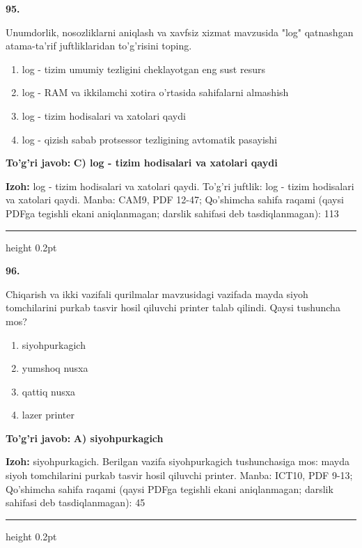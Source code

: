 \documentclass[10pt,a4paper]{article}
\begin{document}
{\bfseries\sffamily\color{ink} 95.}
\par
Unumdorlik, nosozliklarni aniqlash va xavfsiz xizmat mavzusida "log" qatnashgan atama-ta'rif juftliklaridan to'g'risini toping.
\begin{enumerate}[label=\Alph*),leftmargin=9mm]
\item log - tizim umumiy tezligini cheklayotgan eng sust resurs
\item log - RAM va ikkilamchi xotira o'rtasida sahifalarni almashish
\item log - tizim hodisalari va xatolari qaydi
\item log - qizish sabab protsessor tezligining avtomatik pasayishi
\end{enumerate}
\begin{tcolorbox}[enhanced,breakable,colback=teal!4,colframe=teal!60!black,boxrule=0.45pt,arc=1.2mm,left=2.7mm,right=2.7mm,top=1.8mm,bottom=1.8mm,before skip=2mm,after skip=2mm]
{\bfseries\sffamily\color{teal}To'g'ri javob:} \textbf{C) log - tizim hodisalari va xatolari qaydi}
\par\smallskip
{\bfseries Izoh:} log - tizim hodisalari va xatolari qaydi. To'g'ri juftlik: log - tizim hodisalari va xatolari qaydi. Manba: CAM9, PDF 12-47; Qo'shimcha sahifa raqami (qaysi PDFga tegishli ekani aniqlanmagan; darslik sahifasi deb tasdiqlanmagan): 113
\end{tcolorbox}
\vspace{2mm}\hrule height 0.2pt\vspace{3mm}

{\bfseries\sffamily\color{ink} 96.}
\par
Chiqarish va ikki vazifali qurilmalar mavzusidagi vazifada mayda siyoh tomchilarini purkab tasvir hosil qiluvchi printer talab qilindi. Qaysi tushuncha mos?
\begin{enumerate}[label=\Alph*),leftmargin=9mm]
\item siyohpurkagich
\item yumshoq nusxa
\item qattiq nusxa
\item lazer printer
\end{enumerate}
\begin{tcolorbox}[enhanced,breakable,colback=teal!4,colframe=teal!60!black,boxrule=0.45pt,arc=1.2mm,left=2.7mm,right=2.7mm,top=1.8mm,bottom=1.8mm,before skip=2mm,after skip=2mm]
{\bfseries\sffamily\color{teal}To'g'ri javob:} \textbf{A) siyohpurkagich}
\par\smallskip
{\bfseries Izoh:} siyohpurkagich. Berilgan vazifa siyohpurkagich tushunchasiga mos: mayda siyoh tomchilarini purkab tasvir hosil qiluvchi printer. Manba: ICT10, PDF 9-13; Qo'shimcha sahifa raqami (qaysi PDFga tegishli ekani aniqlanmagan; darslik sahifasi deb tasdiqlanmagan): 45
\end{tcolorbox}
\vspace{2mm}\hrule height 0.2pt\vspace{3mm}
\end{document}
